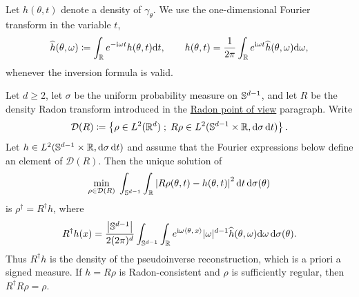 Let $h(\theta,t)$ denote a density of $\gamma_\theta$. We use the one-dimensional Fourier transform in the variable $t$,
\begin{equation}\label{eq-radon-sinogram-fourier}
	\widehat h(\theta,\omega)
	\coloneqq
	\int_{\mathbb{R}}e^{-\mathrm{i}\omega t}h(\theta,t)\mathrm{d} t,
	\qquad
	h(\theta,t)
	=
	\frac{1}{2\pi}\int_{\mathbb{R}}e^{\mathrm{i}\omega t}\widehat h(\theta,\omega)\mathrm{d}\omega,
\end{equation}
whenever the inversion formula is valid.

\begin{prop}\label{prop-radon-pseudoinverse}
	Let $d\geq2$, let $\sigma$ be the uniform probability measure on $\mathbb{S}^{d-1}$, and let $R$ be the density Radon transform introduced in the \hyperref[rem-sliced-radon-viewpoint]{Radon point of view} paragraph. Write
	\[
		\mathcal D(R)
		\coloneqq
		\left\{ \rho\in L^2(\mathbb{R}^d) \;;\; R\rho\in L^2(\mathbb{S}^{d-1}\times\mathbb{R},\mathrm{d}\sigma\,\mathrm{d} t) \right\}.
	\]
	Let $h\in L^2(\mathbb{S}^{d-1}\times\mathbb{R},\mathrm{d}\sigma\,\mathrm{d} t)$ and assume that the Fourier expressions below define an element of $\mathcal D(R)$. Then the unique solution of
	\begin{equation}\label{eq-radon-least-squares}
		\underset{\rho\in\mathcal D(R)}{\min}\;
		\int_{\mathbb{S}^{d-1}}\int_{\mathbb{R}}
		\left\lvert R\rho(\theta,t)-h(\theta,t)\right\rvert^2
		\mathrm{d} t\,\mathrm{d}\sigma(\theta)
	\end{equation}
	is $\rho^\dagger=R^\dagger h$, where
	\begin{equation}\label{eq-radon-pseudoinverse}
		R^\dagger h(x)
		=
		\frac{\left\lvert\mathbb{S}^{d-1}\right\rvert}{2(2\pi)^d}
		\int_{\mathbb{S}^{d-1}}\int_{\mathbb{R}}
		e^{\mathrm{i}\omega\langle \theta,\,x\rangle}
		|\omega|^{d-1}
		\widehat h(\theta,\omega)
		\mathrm{d}\omega\,\mathrm{d}\sigma(\theta).
	\end{equation}
	Thus $R^\dagger h$ is the density of the pseudoinverse reconstruction, which is a priori a signed measure. If $h=R\rho$ is Radon-consistent and $\rho$ is sufficiently regular, then $R^\dagger R\rho=\rho$.
\end{prop}

